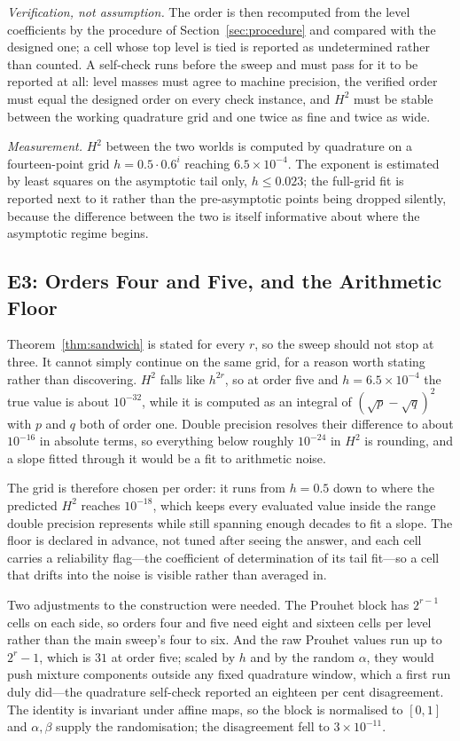 \emph{Verification, not assumption.} The order is then recomputed from the level coefficients
by the procedure of Section~\ref{sec:procedure} and compared with the designed one; a cell
whose top level is tied is reported as undetermined rather than counted. A self-check runs
before the sweep and must pass for it to be reported at all: level masses must agree to
machine precision, the verified order must equal the designed order on every check instance,
and $H^{2}$ must be stable between the working quadrature grid and one twice as fine and
twice as wide.

\emph{Measurement.} $H^{2}$ between the two worlds is computed by quadrature on a
fourteen-point grid $h=0.5\cdot0.6^{i}$ reaching $6.5\times10^{-4}$. The exponent is
estimated by least squares on the asymptotic tail only, $h\le0.023$; the full-grid fit is
reported next to it rather than the pre-asymptotic points being dropped silently, because the
difference between the two is itself informative about where the asymptotic regime begins.

\subsection{E3: Orders Four and Five, and the Arithmetic Floor}
\label{sec:e3}

Theorem~\ref{thm:sandwich} is stated for every $r$, so the sweep should not stop at three. It
cannot simply continue on the same grid, for a reason worth stating rather than discovering.
$H^{2}$ falls like $h^{2r}$, so at order five and $h=6.5\times10^{-4}$ the true value is
about $10^{-32}$, while it is computed as an integral of
$(\sqrt{p}-\sqrt{q})^{2}$ with $p$ and $q$ both of order one. Double precision resolves their
difference to about $10^{-16}$ in absolute terms, so everything below roughly $10^{-24}$ in
$H^{2}$ is rounding, and a slope fitted through it would be a fit to arithmetic noise.

The grid is therefore chosen per order: it runs from $h=0.5$ down to where the predicted
$H^{2}$ reaches $10^{-18}$, which keeps every evaluated value inside the range double
precision represents while still spanning enough decades to fit a slope. The floor is
declared in advance, not tuned after seeing the answer, and each cell carries a reliability
flag---the coefficient of determination of its tail fit---so a cell that drifts into the
noise is visible rather than averaged in.

Two adjustments to the construction were needed. The Prouhet block has $2^{r-1}$ cells on
each side, so orders four and five need eight and sixteen cells per level rather than the
main sweep's four to six. And the raw Prouhet values run up to $2^{r}-1$, which is $31$ at
order five; scaled by $h$ and by the random $\alpha$, they would push mixture components
outside any fixed quadrature window, which a first run duly did---the quadrature self-check
reported an eighteen per cent disagreement. The identity is invariant under affine maps, so
the block is normalised to $[0,1]$ and $\alpha,\beta$ supply the randomisation; the
disagreement fell to $3\times10^{-11}$.

